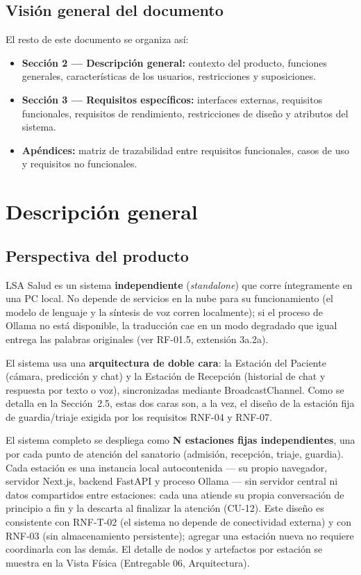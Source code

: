 \subsection{Visión general del documento}

El resto de este documento se organiza así:
\begin{itemize}
    \item \textbf{Sección 2 --- Descripción general:} contexto del
    producto, funciones generales, características de los usuarios,
    restricciones y suposiciones.
    \item \textbf{Sección 3 --- Requisitos específicos:} interfaces
    externas, requisitos funcionales, requisitos de rendimiento,
    restricciones de diseño y atributos del sistema.
    \item \textbf{Apéndices:} matriz de trazabilidad entre requisitos
    funcionales, casos de uso y requisitos no funcionales.
\end{itemize}

\section{Descripción general}

\subsection{Perspectiva del producto}

LSA Salud es un sistema \textbf{independiente} (\textit{standalone}) que
corre íntegramente en una PC local. No depende de servicios en la nube
para su funcionamiento (el modelo de lenguaje y la síntesis de voz corren
localmente); si el proceso de Ollama no está disponible, la traducción cae
en un modo degradado que igual entrega las palabras originales
(ver RF-01.5, extensión 3a.2a).

El sistema usa una \textbf{arquitectura de doble cara}: la Estación
del Paciente (cámara, predicción y chat) y la Estación de Recepción
(historial de chat y respuesta por texto o voz), sincronizadas mediante
BroadcastChannel. Como se detalla en la
Sección~2.5, estas dos caras son, a la vez, el diseño de la estación fija
de guardia/triaje exigida por los requisitos RNF-04 y RNF-07.

El sistema completo se despliega como \textbf{N estaciones fijas
independientes}, una por cada punto de atención del sanatorio (admisión,
recepción, triaje, guardia). Cada estación es una instancia local
autocontenida --- su propio navegador, servidor Next.js, backend FastAPI y
proceso Ollama --- sin servidor central ni datos compartidos entre
estaciones: cada una atiende su propia conversación de principio a fin y
la descarta al finalizar la atención (CU-12). Este diseño es consistente
con RNF-T-02 (el sistema no depende de conectividad externa) y con RNF-03
(sin almacenamiento persistente); agregar una estación nueva no requiere
coordinarla con las demás. El detalle de nodos y artefactos por estación
se muestra en la Vista Física (Entregable 06, Arquitectura).

